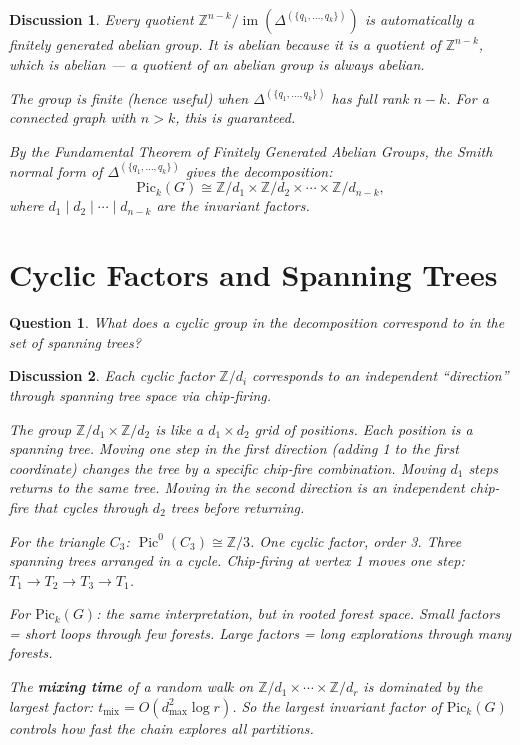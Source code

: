\documentclass[11pt]{article}
\newcommand{\Z}{\mathbb{Z}}
\newcommand{\Pic}{\operatorname{Pic}^0}
\newtheorem{question}{Question}
\newtheorem{answer}{Discussion}
\begin{document}
\begin{answer}
Every quotient $\Z^{n-k} / \operatorname{im}(\Delta^{(\{q_1,\ldots,q_k\})})$
is automatically a finitely generated abelian group. It is abelian because it
is a quotient of $\Z^{n-k}$, which is abelian --- a quotient of an abelian
group is always abelian.

The group is finite (hence useful) when $\Delta^{(\{q_1,\ldots,q_k\})}$ has
full rank $n-k$. For a connected graph with $n > k$, this is guaranteed.

By the Fundamental Theorem of Finitely Generated Abelian Groups, the Smith
normal form of $\Delta^{(\{q_1,\ldots,q_k\})}$ gives the decomposition:
\[
  \mathrm{Pic}_k(G) \cong \Z/d_1 \times \Z/d_2 \times \cdots \times
    \Z/d_{n-k},
\]
where $d_1 \mid d_2 \mid \cdots \mid d_{n-k}$ are the invariant factors.
\end{answer}


\section{Cyclic Factors and Spanning Trees}

\begin{question}
What does a cyclic group in the decomposition correspond to in the set of
spanning trees?
\end{question}

\begin{answer}
Each cyclic factor $\Z/d_i$ corresponds to an independent ``direction'' through
spanning tree space via chip-firing.

The group $\Z/d_1 \times \Z/d_2$ is like a $d_1 \times d_2$ grid of
positions. Each position is a spanning tree. Moving one step in the first
direction (adding 1 to the first coordinate) changes the tree by a specific
chip-fire combination. Moving $d_1$ steps returns to the same tree. Moving in
the second direction is an independent chip-fire that cycles through $d_2$
trees before returning.

For the triangle $C_3$: $\Pic(C_3) \cong \Z/3$. One cyclic factor, order 3.
Three spanning trees arranged in a cycle. Chip-firing at vertex 1 moves one
step: $T_1 \to T_2 \to T_3 \to T_1$.

For $\mathrm{Pic}_k(G)$: the same interpretation, but in rooted forest space.
Small factors = short loops through few forests. Large factors = long
explorations through many forests.

The \textbf{mixing time} of a random walk on
$\Z/d_1 \times \cdots \times \Z/d_r$ is dominated by the largest factor:
$t_{\mathrm{mix}} = O(d_{\max}^2 \log r)$. So the largest invariant factor of
$\mathrm{Pic}_k(G)$ controls how fast the chain explores all partitions.
\end{answer}
\end{document}
